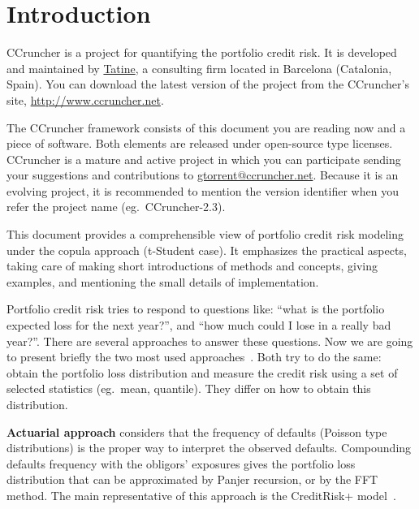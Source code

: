 \documentclass[11pt,fleqn]{book} %
\def\numversion{2.3}
\begin{document}
\chapter{Introduction}

CCruncher is a project for quantifying the portfolio credit risk. 
It is developed and maintained by \href{http://www.tatine.es}{Tatine}, 
a consulting firm located in Barcelona (Catalonia, Spain). You can download 
the latest version of the project from the CCruncher's site, 
\url{http://www.ccruncher.net}.

The CCruncher framework consists of this document you are reading now and a 
piece of software. Both elements are released under open-source type licenses. 
CCruncher is a mature and active project in which you can participate sending 
your suggestions and contributions to \href{mailto:gtorrent@ccruncher.net}
{gtorrent@ccruncher.net}. Because it is an evolving project, it is recommended 
to mention the version identifier when you refer the project name 
(eg.\ CCruncher-\numversion).

This document provides a comprehensible view of portfolio credit risk modeling 
under the copula approach (t-Student case). It emphasizes the practical aspects, 
taking care of making short introductions of methods and concepts, giving 
examples, and mentioning the small details of implementation. 

Portfolio credit risk tries to respond to questions like: ``what is the 
portfolio expected loss for the next year?'', and ``how much could I 
lose in a really bad year?''. There are several approaches to answer these 
questions. Now we are going to present briefly the two most used 
approaches~\cite{crouhy:2000}\cite[chap. 2.4]{bluhm:2002}. 
Both try to do the same: obtain the portfolio loss distribution and measure 
the credit risk using a set of selected statistics (eg.\ mean, quantile). 
They differ on how to obtain this distribution. 

\textbf{Actuarial approach} considers that the frequency 
of defaults (Poisson type distributions) is the proper way to interpret the 
observed defaults. Compounding defaults frequency with the obligors' exposures 
gives the portfolio loss distribution that can be approximated by Panjer 
recursion, or by the FFT method. The main representative of this approach is 
the CreditRisk+ model~\cite{creditrisk+:1997}.
\end{document}
